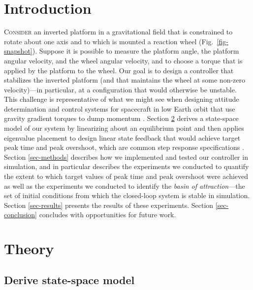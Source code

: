 \documentclass[conf]{new-aiaa}
\begin{document}
\section{Introduction}
\lettrine{C}{onsider} an inverted platform in a gravitational field that is constrained to rotate about one axis and to which is mounted a reaction wheel (Fig.~\ref{fig-snapshot}). Suppose it is possible to measure the platform angle, the platform angular velocity, and the wheel angular velocity, and to choose a torque that is applied by the platform to the wheel. Our goal is to design a controller that stabilizes the inverted platform (and that maintains the wheel at some non-zero velocity)---in particular, at a configuration that would otherwise be unstable. This challenge is representative of what we might see when designing attitude determination and control systems for spacecraft in low Earth orbit that use gravity gradient torques to dump momentum \cite{Markley2014}. Section \ref{sec-theory} derives a state-space model of our system by linearizing about an equilibrium point and then applies eigenvalue placement to design linear state feedback that would achieve target peak time and peak overshoot, which are common step response specifications \cite{Astrom2021}.
Section \ref{sec-methods} describes how we implemented and tested our controller in simulation, and in particular describes the experiments we conducted to quantify the extent to which target values of peak time and peak overshoot were achieved as well as the experiments we conducted to identify the {\em basin of attraction}---the set of initial conditions from which the closed-loop system is stable in simulation. Section \ref{sec-results} presents the results of these experiments.
Section \ref{sec-conclusion} concludes with opportunities for future work.


\section{Theory}
\label{sec-theory}

\subsection{Derive state-space model}
\label{sec-model}
\end{document}
